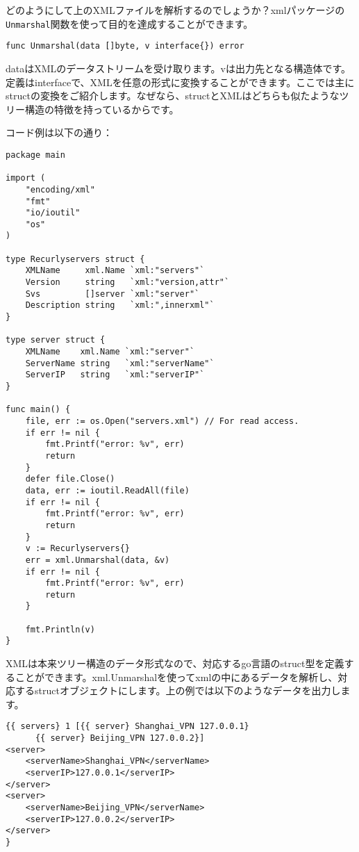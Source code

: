 どのようにして上のXMLファイルを解析するのでしょうか？xmlパッケージの\texttt{Unmarshal}関数を使って目的を達成することができます。

\begin{lstlisting}[numbers=none]
func Unmarshal(data []byte, v interface{}) error
\end{lstlisting}

dataはXMLのデータストリームを受け取ります。vは出力先となる構造体です。定義はinterfaceで、XMLを任意の形式に変換することができます。ここでは主にstructの変換をご紹介します。なぜなら、structとXMLはどちらも似たようなツリー構造の特徴を持っているからです。

コード例は以下の通り：

\begin{lstlisting}[numbers=none]
package main

import (
    "encoding/xml"
    "fmt"
    "io/ioutil"
    "os"
)

type Recurlyservers struct {
    XMLName     xml.Name `xml:"servers"`
    Version     string   `xml:"version,attr"`
    Svs         []server `xml:"server"`
    Description string   `xml:",innerxml"`
}

type server struct {
    XMLName    xml.Name `xml:"server"`
    ServerName string   `xml:"serverName"`
    ServerIP   string   `xml:"serverIP"`
}

func main() {
    file, err := os.Open("servers.xml") // For read access.        
    if err != nil {
        fmt.Printf("error: %v", err)
        return
    }
    defer file.Close()
    data, err := ioutil.ReadAll(file)
    if err != nil {
        fmt.Printf("error: %v", err)
        return
    }
    v := Recurlyservers{}
    err = xml.Unmarshal(data, &v)
    if err != nil {
        fmt.Printf("error: %v", err)
        return
    }

    fmt.Println(v)
}
\end{lstlisting}

XMLは本来ツリー構造のデータ形式なので、対応するgo言語のstruct型を定義することができます。xml.Unmarshalを使ってxmlの中にあるデータを解析し、対応するstructオブジェクトにします。上の例では以下のようなデータを出力します。

\begin{lstlisting}[numbers=none]
{{ servers} 1 [{{ server} Shanghai_VPN 127.0.0.1}
      {{ server} Beijing_VPN 127.0.0.2}]
<server>
    <serverName>Shanghai_VPN</serverName>
    <serverIP>127.0.0.1</serverIP>
</server>
<server>
    <serverName>Beijing_VPN</serverName>
    <serverIP>127.0.0.2</serverIP>
</server>
}
\end{lstlisting}

